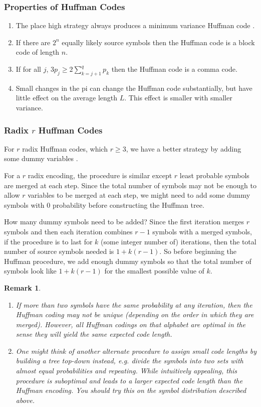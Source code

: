\documentclass{article}
\newtheorem*{remark}{Remark}
\begin{document}
\subsubsection{Properties of Huffman Codes}

\begin{enumerate}
    \item The place high strategy always produces a minimum variance Huffman code .
    \item If there are $2^{n}$ equally likely source symbols then the Huffman code is a block code of length $n$.
    \item If for all $j$, $3p_{j} \geq 2 \sum_{k=j+1}^{q}p_{k}$ then the Huffman code is a comma code.
    \item Small changes in the pi can change the Huffman code substantially, but have little effect on the average length $L$. This effect is smaller with smaller variance.
\end{enumerate}

\subsubsection{Radix $r$ Huffman Codes}

For $r$ radix Huffman codes, which $r \geq 3$, we have a better strategy by adding some dummy variables \cite{cmuLec8}.

For a $r$ radix encoding, the procedure is similar except $r$ least probable symbols are merged at each step. Since the total number of symbols may not be enough to allow $r$ variables to be merged at each step, we might need to add some dummy symbols with $0$ probability before constructing the Huffman tree.

How many dummy symbols need to be added? Since the first iteration merges $r$ symbols and then each iteration combines $r-1$ symbols with a merged symbols, if the procedure is to last for $k$ (some integer number of) iterations, then the total number of source symbols needed is $1+k(r-1)$. So before beginning the Huffman procedure, we add enough dummy symbols so that the total number of symbols look like $1+k(r-1)$ for the smallest possible value of $k$.

\begin{remark}
    \mbox{}
    \begin{enumerate}
        \item If more than two symbols have the same probability at any iteration, then the Huffman coding may not be unique (depending on the order in which they are merged). However, all Huffman codings on that alphabet are optimal in the sense they will yield the same expected code length.	
        \item 	One might think of another alternate procedure to assign small code lengths by building a tree top-down instead, e.g. divide the symbols into two sets with almost equal probabilities and repeating. While intuitively appealing, this procedure is suboptimal and leads to a larger expected code length than the Huffman encoding. You should try this on the symbol distribution described above.
    \end{enumerate}
\end{remark}
\end{document}

